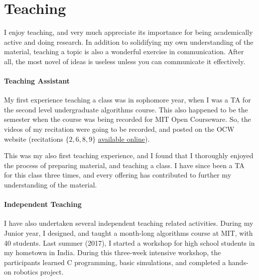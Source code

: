 \section*{Teaching}

I enjoy teaching, and very much appreciate its importance for being academically active and doing research.
In addition to solidifying my own understanding of the material, teaching a topic is also a wonderful exercise in communication.
After all, the most novel of ideas is useless unless you can communicate it effectively.

\paragraph{Teaching Assistant}
\label{par:teaching_assistant}
My first experience teaching a class was in sophomore year, when I was a TA for the second level undergraduate algorithms course.
This also happened to be the semester when the course was being recorded for MIT Open Courseware.
So, the videos of my recitation were going to be recorded, and posted on the OCW website (recitations $\{2,6,8,9\}$
\href{https://ocw.mit.edu/courses/electrical-engineering-and-computer-science/6-046j-design-and-analysis-of-algorithms-spring-2015/recitation-videos/}{available online}).

This was my also first teaching experience, and I found that
I thoroughly enjoyed the process of preparing material, and teaching a class.
I have since been a TA for this class three times, and every offering has contributed to further my understanding of the material.

\paragraph{Independent Teaching}
\label{par:independent_teaching}
I have also undertaken several independent teaching related activities.
During my Junior year, I designed, and taught a month-long algorithms course at MIT, with 40 students.
Last summer (2017), I started a workshop for high school students in my hometown in India.
During this three-week intensive workshop, the participants learned C programming,
basic simulations, and completed a hands-on robotics project.
